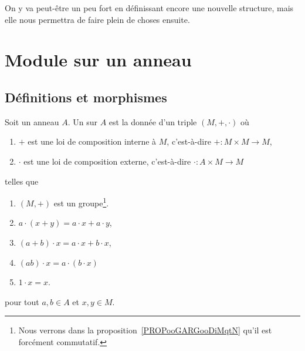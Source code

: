 
On y va peut-être un peu fort en définissant encore une nouvelle structure, mais elle nous permettra de faire plein de choses ensuite.

\section{Module sur un anneau}

\subsection{Définitions et morphismes}

\begin{definition}       \label{DEFooHXITooBFvzrR}
    Soit un anneau \( A\). Un  sur \( A\) est la donnée d'un triple \( (M,+,\cdot)\) où
    \begin{enumerate}
        \item
            \( +\) est une loi de composition interne à \( M\), c'est-à-dire \( +\colon M\times M\to M\),
        \item
            \( \cdot\) est une loi de composition externe, c'est-à-dire \( \cdot\colon A\times M\to M\)
    \end{enumerate}
    telles que
    \begin{enumerate}
        \item
            \( (M,+)\) est un groupe\footnote{Nous verrons dans la proposition~\ref{PROPooGARGooDiMqtN} qu'il est forcément commutatif.}.
        \item
            \( a\cdot(x+y)=a\cdot x+a\cdot y\),
        \item
            \( (a+b)\cdot x=a\cdot x+b\cdot x\),
        \item
            \( (ab)\cdot x=a\cdot(b\cdot x)\)
        \item
            \( 1\cdot x=x\).
    \end{enumerate}
    pour tout \( a,b\in A\) et \( x,y\in M\).
\end{definition}

